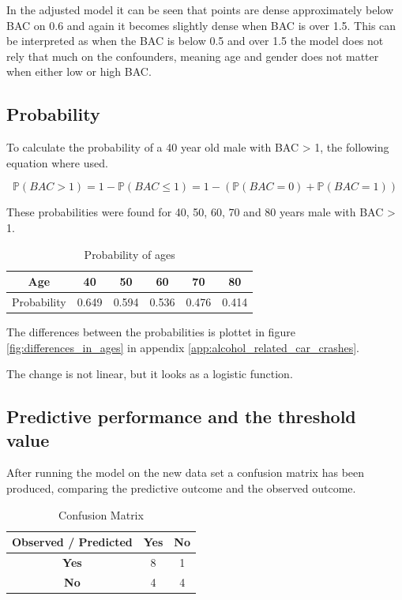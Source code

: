 In the adjusted model it can be seen that points are dense approximately below BAC on 0.6 and again it becomes slightly dense when BAC is over 1.5. This can be interpreted as when the BAC is below 0.5 and over 1.5 the model does not rely that much on the confounders, meaning age and gender does not matter when either low or high BAC.

\subsection{Probability}

To calculate the probability of a 40 year old male with BAC > 1, the following equation where used.

$$
\mathbb{P}(BAC > 1) = 1 - \mathbb{P}(BAC \leq 1) = 1 - (\mathbb{P}(BAC = 0) + \mathbb{P}(BAC = 1))
$$

These probabilities were found for 40, 50, 60, 70 and 80 years male with BAC > 1.

\begin{table}[]
    \centering
    \begin{tabular}{|c|c|c|c|c|c|} \hline
        Age & 40 & 50 & 60 & 70 & 80 \\ \hline
        Probability & 0.649 & 0.594 & 0.536 & 0.476 & 0.414 \\ \hline
    \end{tabular}
    \caption{Probability of ages}
    \label{tab:probs_ages}
\end{table}

The differences between the probabilities is plottet in figure \ref{fig:differences_in_ages} in appendix \ref{app:alcohol_related_car_crashes}.

The change is not linear, but it looks as a logistic function.

\subsection{Predictive performance and the threshold value}

After running the model on the new data set a confusion matrix has been produced, comparing the predictive outcome and the observed outcome.

\begin{table}[H]
    \centering
    \begin{tabular}{c|c|c}
      Observed / Predicted & \textbf{Yes} & \textbf{No} \\ \hline
      \textbf{Yes} & 8 & 1 \\
      \textbf{No} & 4 & 4
    \end{tabular}
    \caption{Confusion Matrix}
    \label{tab:my_label}
\end{table}

